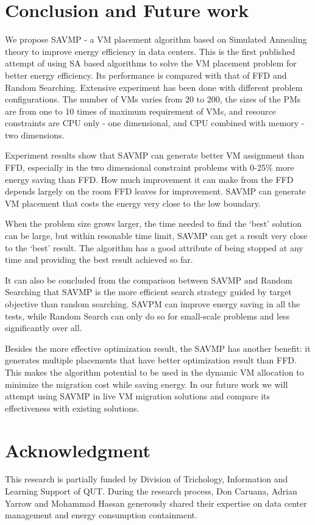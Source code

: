\documentclass[10pt, conference, compsocconf]{IEEEtran}
\begin{document}
\section{Conclusion and Future work}

We propose SAVMP - a VM placement algorithm based on Simulated Annealing theory
to improve energy efficiency in data centers. This is the first published
attempt of using SA based algorithms to solve the VM placement problem for
better energy efficiency. Its performance is compared with that of FFD and
Random Searching.
Extensive experiment has been done with different problem configurations. The
number of VMs varies from 20 to 200, the sizes of the PMs are from one to 10
times of maximum requirement of VMs, and resource constraints are CPU only - one
dimensional, and CPU combined with memory - two dimensions.

Experiment results show that SAVMP can generate better VM assignment than FFD,
especially in the two dimensional constraint problems with 0-25\% more energy
saving than FFD. How much improvement it can make from the FFD depends largely
on the room FFD leaves for improvement. SAVMP can generate VM placement that
costs the energy very close to the low boundary.

When the problem size grows larger, the time needed to find the `best' solution
can be large, but within resonable time limit, SAVMP can get a result very
close to the `best' result. The algorithm has a good attribute of being stopped
at any time and providing the best result achieved so far.

It can also be concluded from the comparison between SAVMP and Random
Searching that SAVMP is the more efficient search strategy guided by target
objective than random searching. SAVPM can improve energy saving in all the tests, while
Random Search can only do so for small-scale problems and less significantly
over all.

Besides the more effective optimization result, the SAVMP has another benefit:
it generates multiple placements that have better optimization result than FFD.
This makes the algorithm potential to be used in the dynamic VM allocation to
minimize the migration cost while saving energy. In our future work we will
attempt using SAVMP in live VM migration solutions and compare its effectiveness
with existing solutions.

\section*{Acknowledgment}
This research is partially funded by Division of Trichology, Information and
Learning Support of QUT.
During the research process, Don Caruana, Adrian Yarrow and Mohammad Hassan 
generously shared their expertise on data center management and 
energy consumption containment.




\end{document}
